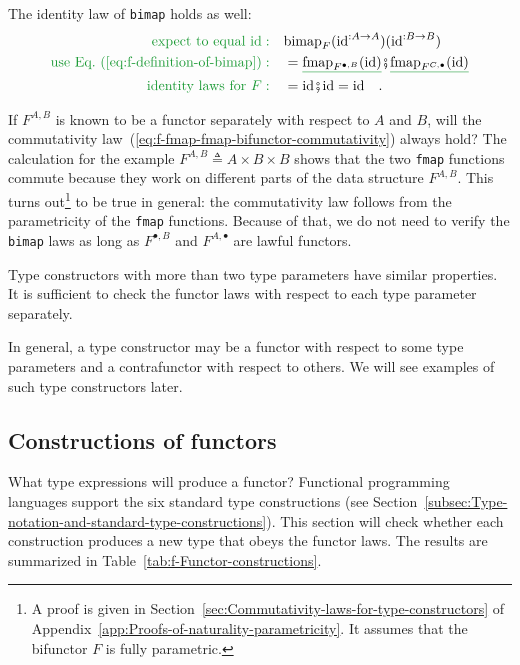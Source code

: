 The identity law of \lstinline!bimap! holds as well:
\begin{align*}
{\color{greenunder}\text{expect to equal }\text{id}:}\quad & \text{bimap}_{F}(\text{id}^{:A\rightarrow A})(\text{id}^{:B\rightarrow B})\\
{\color{greenunder}\text{use Eq.~(\ref{eq:f-definition-of-bimap})}:}\quad & =\gunderline{\text{fmap}_{F^{\bullet,B}}(\text{id})}\bef\gunderline{\text{fmap}_{F^{C,\bullet}}(\text{id})}\\
{\color{greenunder}\text{identity laws for }F:}\quad & =\text{id}\bef\text{id}=\text{id}\quad.
\end{align*}

If $F^{A,B}$ is known to be a functor separately with respect to
$A$ and $B$, will the commutativity law~(\ref{eq:f-fmap-fmap-bifunctor-commutativity})
always hold? The calculation for the example $F^{A,B}\triangleq A\times B\times B$
shows that the two \lstinline!fmap! functions commute because they
work on different parts of the data structure $F^{A,B}$. This turns
out\footnote{A proof is given in Section~\ref{sec:Commutativity-laws-for-type-constructors}
of Appendix~\ref{app:Proofs-of-naturality-parametricity}. It assumes
that the bifunctor $F$ is fully parametric.} to be true in general: the commutativity law follows from the parametricity
of the \lstinline!fmap! functions. Because of that, we do not need
to verify the \lstinline!bimap! laws as long as $F^{\bullet,B}$
and $F^{A,\bullet}$ are lawful functors.

Type constructors with more than two type parameters have similar
properties. It is sufficient to check the functor laws with respect
to each type parameter separately.

In general, a type constructor may be a functor with respect to some
type parameters and a contrafunctor with respect to others. We will
see examples of such type constructors later.

\subsection{Constructions of functors\label{subsec:f-Functor-constructions}}

What type expressions will produce a functor? Functional programming
languages support the six standard type constructions (see Section~\ref{subsec:Type-notation-and-standard-type-constructions}).
This section will check whether each construction produces a new type
that obeys the functor laws. The results are summarized in Table~\ref{tab:f-Functor-constructions}.

